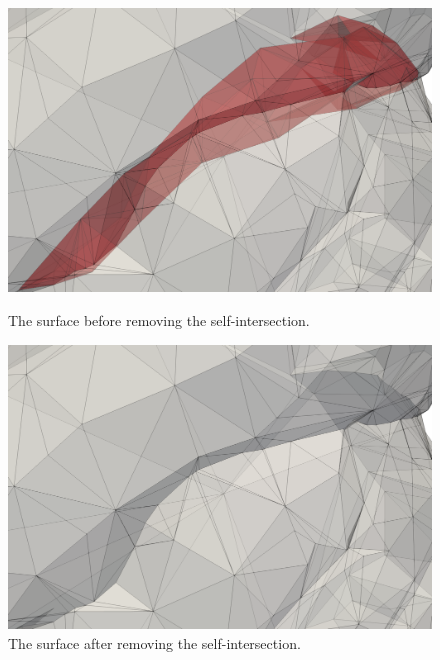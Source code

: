 \documentclass[
11pt,%
tightenlines,%
twoside,%
onecolumn,%
nofloats,%
nobibnotes,%
nofootinbib,%
superscriptaddress,%
noshowpacs,%
centertags]%
{revtex4-2}
\begin{document}
\begin{figure}[h]
  \centering
  \begin{minipage}[h]{0.4\textwidth}
    \includegraphics[width=\textwidth]{pics/pic_self_intersection_on_2.png}
    \caption{The surface before removing the self-intersection.}\label{fig:pic_self_intersection_on_2}
  \end{minipage}
  \begin{minipage}[h]{0.4\textwidth}
    \includegraphics[width=\textwidth]{pics/pic_self_intersection_off_2.png}
    \caption{The surface after removing the self-intersection.}\label{fig:pic_self_intersection_off_2}
  \end{minipage}
\end{figure}
\end{document}
